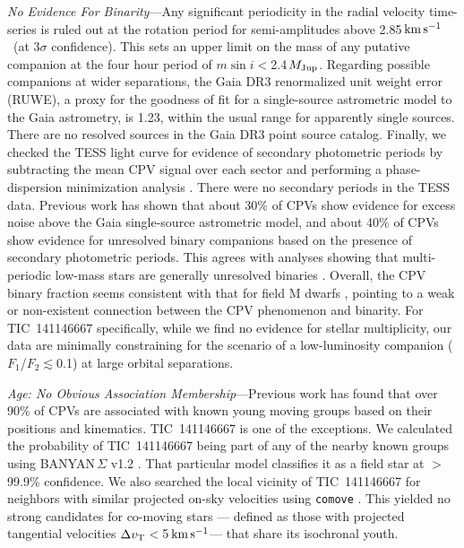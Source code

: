 \documentclass{nature3}
\newcommand{\kms}{\ensuremath{\rm km\,s^{-1}}}
\begin{document}
\begin{methods}
{\it No Evidence For Binarity}---Any significant periodicity in the
radial velocity time-series is ruled out at the rotation period for
semi-amplitudes above 2.85\,\kms\ (at 3$\sigma$ confidence).  This
sets an upper limit on the mass of any putative companion at the four
hour period of $m \sin i $$<$2.4\,$M_{\rm Jup}$.  Regarding possible
companions at wider separations, the Gaia DR3 renormalized unit weight
error (RUWE), a proxy for the goodness of fit for a single-source
astrometric model to the Gaia astrometry, is 1.23, within the
usual range for apparently single sources.  There are no resolved
sources in the Gaia DR3 point source catalog.  Finally, we checked the
TESS light curve for evidence of secondary photometric periods by
subtracting the mean CPV signal over each sector and performing a
phase-dispersion minimization analysis
\cite{Stellingwerf1978,2021zndo...1011188B}.  There were no secondary
periods in the TESS data.  Previous work \cite{Bouma2024} has shown
that about 30\% of CPVs show evidence for excess noise above the Gaia
single-source astrometric model, and about 40\% of CPVs show evidence
for unresolved binary companions based on the presence of secondary
photometric periods.  This agrees with analyses showing that
multi-periodic low-mass stars are generally unresolved binaries
\cite{Tokovinin2018}.  Overall, the CPV binary fraction seems
consistent with that for field M dwarfs \cite{Winters2019},
pointing to a weak or non-existent connection between the CPV
phenomenon and binarity.  For TIC~141146667 specifically, while we find 
no evidence for stellar multiplicity, our data are minimally
constraining for the scenario of a low-luminosity companion
($F_1$/$F_2$$\lesssim$0.1) at large orbital separations.


{\it Age: No Obvious Association Membership}---Previous work
\cite{Bouma2024} has found that over 90\% of CPVs are associated with
known young moving groups based on their positions and kinematics.
TIC~141146667 is one of the exceptions.  We calculated the probability
of TIC~141146667 being part of any of the nearby known groups using
BANYAN\,$\Sigma$ v1.2 \cite{Gagne2018}.  That particular model
classifies it as a field star at $>$99.9\% confidence.  We also searched the
local vicinity of TIC~141146667 for neighbors with similar projected on-sky
velocities using \texttt{comove} \cite{Tofflemire2021}.  This yielded
no strong candidates for co-moving stars --- defined as those with
projected tangential velocities $\Delta v_{\rm T}$$<$5\,\kms ---
that share its isochronal youth.


\end{methods}
\end{document}
